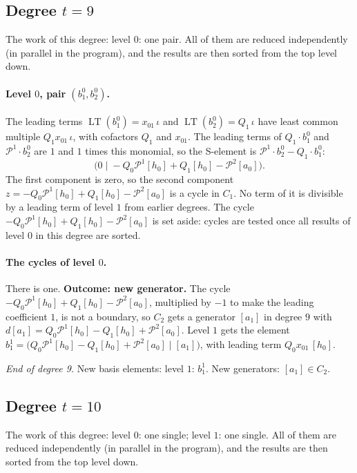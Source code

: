 \documentclass[11pt]{article}
\renewcommand{\P}{\mathcal{P}}
\DeclareMathOperator{\LT}{LT}
\begin{document}
\subsection*{Degree $t = 9$}
\noindent The work of this degree: level $0$: one pair. All of them are reduced independently (in parallel in the program), and the results are then sorted from the top level down.
\medskip
\paragraph{Level $0$, pair $(b^{0}_{1}, b^{0}_{2})$.} The leading terms $\LT(b^{0}_{1}) = x_{01}\,\iota$ and $\LT(b^{0}_{2}) = Q_{1}\,\iota$ have least common multiple $Q_{1}x_{01}\,\iota$, with cofactors $Q_{1}$ and $x_{01}$.
The leading terms of $Q_{1}\cdot b^{0}_{1}$ and $\P^{1}\cdot b^{0}_{2}$ are $1$ and $1$ times this monomial, so the S-element is $\P^{1}\cdot b^{0}_{2} - Q_{1}\cdot b^{0}_{1}$:
\[\bigl(0 \;\big|\; -Q_{0}\P^{1}[h_0] + Q_{1}[h_0] - \P^{2}[a_0]\bigr).\]
The first component is zero, so the second component $z = -Q_{0}\P^{1}[h_0] + Q_{1}[h_0] - \P^{2}[a_0]$ is a cycle in $C_{1}$.
No term of it is divisible by a leading term of level $1$ from earlier degrees.
The cycle $-Q_{0}\P^{1}[h_0] + Q_{1}[h_0] - \P^{2}[a_0]$ is set aside: cycles are tested once all results of level $0$ in this degree are sorted.
\medskip
\paragraph{The cycles of level $0$.} There is one.
\textbf{Outcome: new generator.} The cycle $-Q_{0}\P^{1}[h_0] + Q_{1}[h_0] - \P^{2}[a_0]$, multiplied by $-1$ to make the leading coefficient $1$, is not a boundary, so $C_{2}$ gets a generator $[a_1]$ in degree $9$ with $d[a_1] = Q_{0}\P^{1}[h_0] - Q_{1}[h_0] + \P^{2}[a_0]$.
Level $1$ gets the element $b^{1}_{1} = \bigl(Q_{0}\P^{1}[h_0] - Q_{1}[h_0] + \P^{2}[a_0] \;\big|\; [a_1]\bigr)$, with leading term $Q_{0}x_{01}\,[h_0]$.
\medskip
\par\noindent\emph{End of degree 9.} New basis elements: level $1$: $b^{1}_{1}$. New generators: $[a_1]\in C_{2}$.
\subsection*{Degree $t = 10$}
\noindent The work of this degree: level $0$: one single; level $1$: one single. All of them are reduced independently (in parallel in the program), and the results are then sorted from the top level down.
\medskip
\end{document}
